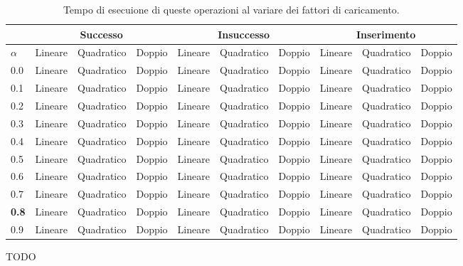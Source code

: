 \documentclass{article}
\begin{document}
\begin{center}
\begin{table}[H]
\begin{tabular}{l|l|l|l|l|l|l|l|l|l|}
\cline{2-10}
& \multicolumn{3}{c|}{Successo} & \multicolumn{3}{c|}{Insuccesso} & \multicolumn{3}{c|}{Inserimento} \\
\hline
\multicolumn{1}{|l|}{$\alpha$} & Lineare & Quadratico & Doppio & Lineare & Quadratico & Doppio  & Lineare & Quadratico & Doppio \\
\hline
\multicolumn{1}{|l|}{0.0} & Lineare & Quadratico & Doppio & Lineare & Quadratico & Doppio  & Lineare & Quadratico & Doppio \\
\hline
\multicolumn{1}{|l|}{0.1} & Lineare & Quadratico & Doppio & Lineare & Quadratico & Doppio  & Lineare & Quadratico & Doppio \\
\hline
\multicolumn{1}{|l|}{0.2} & Lineare & Quadratico & Doppio & Lineare & Quadratico & Doppio  & Lineare & Quadratico & Doppio \\
\hline
\multicolumn{1}{|l|}{0.3} & Lineare & Quadratico & Doppio & Lineare & Quadratico & Doppio  & Lineare & Quadratico & Doppio \\
\hline
\multicolumn{1}{|l|}{0.4} & Lineare & Quadratico & Doppio & Lineare & Quadratico & Doppio  & Lineare & Quadratico & Doppio \\
\hline
\multicolumn{1}{|l|}{0.5} & Lineare & Quadratico & Doppio & Lineare & Quadratico & Doppio  & Lineare & Quadratico & Doppio \\
\hline
\multicolumn{1}{|l|}{0.6} & Lineare & Quadratico & Doppio & Lineare & Quadratico & Doppio  & Lineare & Quadratico & Doppio \\
\hline
\multicolumn{1}{|l|}{0.7} & Lineare & Quadratico & Doppio & Lineare & Quadratico & Doppio  & Lineare & Quadratico & Doppio \\
\hline
\multicolumn{1}{|l|}{\textbf{0.8}} & Lineare & Quadratico & Doppio & Lineare & Quadratico & Doppio  & Lineare & Quadratico & Doppio \\
\hline
\multicolumn{1}{|l|}{0.9} & Lineare & Quadratico & Doppio & Lineare & Quadratico & Doppio  & Lineare & Quadratico & Doppio \\
\hline
\end{tabular}
\label{tab:Confronto_tempi}
\caption{Tempo di esecuione di queste operazioni al variare dei fattori di caricamento.}
\end{table}
\end{center}


\begin{Huge}
TODO
\end{Huge}
\end{document}
